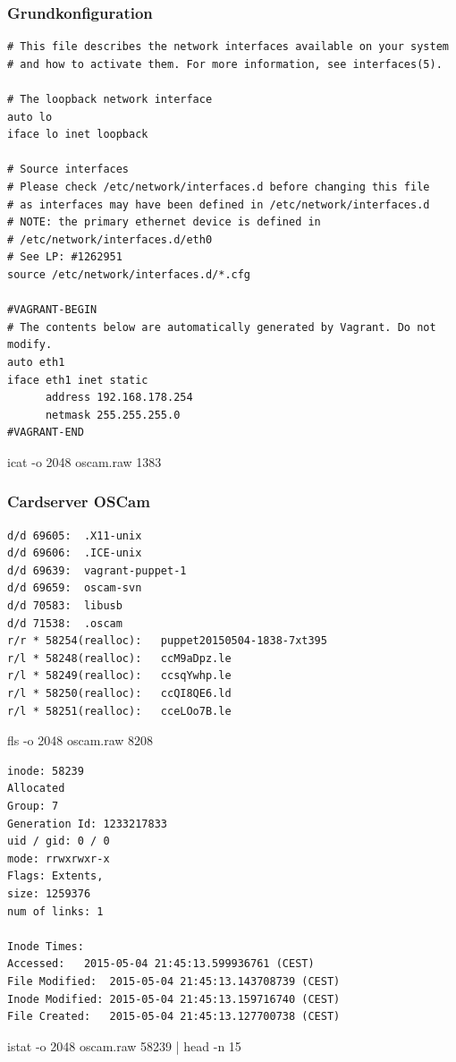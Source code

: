 \subsubsection{Grundkonfiguration}

\begin{cmd}[H]
\begin{verbatim}
# This file describes the network interfaces available on your system
# and how to activate them. For more information, see interfaces(5).

# The loopback network interface
auto lo
iface lo inet loopback

# Source interfaces
# Please check /etc/network/interfaces.d before changing this file
# as interfaces may have been defined in /etc/network/interfaces.d
# NOTE: the primary ethernet device is defined in
# /etc/network/interfaces.d/eth0
# See LP: #1262951
source /etc/network/interfaces.d/*.cfg

#VAGRANT-BEGIN
# The contents below are automatically generated by Vagrant. Do not modify.
auto eth1
iface eth1 inet static
      address 192.168.178.254
      netmask 255.255.255.0
#VAGRANT-END
\end{verbatim}
\caption{icat -o 2048 oscam.raw 1383}
\label{cmd:oscam-interfaces}
\end{cmd}

\subsubsection{Cardserver OSCam}

\begin{cmd}[H]
\begin{verbatim}
d/d 69605:	.X11-unix
d/d 69606:	.ICE-unix
d/d 69639:	vagrant-puppet-1
d/d 69659:	oscam-svn
d/d 70583:	libusb
d/d 71538:	.oscam
r/r * 58254(realloc):	puppet20150504-1838-7xt395
r/l * 58248(realloc):	ccM9aDpz.le
r/l * 58249(realloc):	ccsqYwhp.le
r/l * 58250(realloc):	ccQI8QE6.ld
r/l * 58251(realloc):	cceLOo7B.le
\end{verbatim}
\caption{fls -o 2048 oscam.raw 8208}
\label{cmd:oscam-tmp}
\end{cmd}

\begin{cmd}[H]
\begin{verbatim}
inode: 58239
Allocated
Group: 7
Generation Id: 1233217833
uid / gid: 0 / 0
mode: rrwxrwxr-x
Flags: Extents,
size: 1259376
num of links: 1

Inode Times:
Accessed:	2015-05-04 21:45:13.599936761 (CEST)
File Modified:	2015-05-04 21:45:13.143708739 (CEST)
Inode Modified:	2015-05-04 21:45:13.159716740 (CEST)
File Created:	2015-05-04 21:45:13.127700738 (CEST)
\end{verbatim}
\caption{istat -o 2048 oscam.raw 58239 | head -n 15}
\label{cmd:oscam-bin}
\end{cmd}

